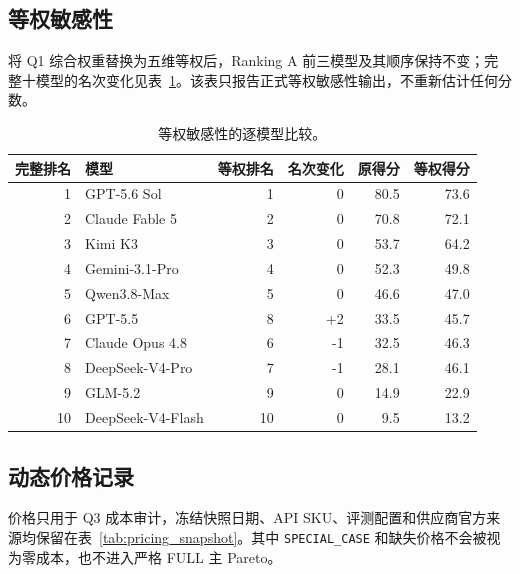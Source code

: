 \subsection{等权敏感性}
将 Q1 综合权重替换为五维等权后，Ranking A 前三模型及其顺序保持不变；完整十模型的名次变化见表~\ref{tab:equalweight}。该表只报告正式等权敏感性输出，不重新估计任何分数。

\begin{table}[htbp]
\centering
\caption{等权敏感性的逐模型比较。}
\label{tab:equalweight}
\small
\begin{tabularx}{\textwidth}{rXrrrr}
\toprule
完整排名 & 模型 & 等权排名 & 名次变化 & 原得分 & 等权得分\\
\midrule
1 & GPT-5.6 Sol & 1 & 0 & 80.5 & 73.6 \\
2 & Claude Fable 5 & 2 & 0 & 70.8 & 72.1 \\
3 & Kimi K3 & 3 & 0 & 53.7 & 64.2 \\
4 & Gemini-3.1-Pro & 4 & 0 & 52.3 & 49.8 \\
5 & Qwen3.8-Max & 5 & 0 & 46.6 & 47.0 \\
6 & GPT-5.5 & 8 & +2 & 33.5 & 45.7 \\
7 & Claude Opus 4.8 & 6 & -1 & 32.5 & 46.3 \\
8 & DeepSeek-V4-Pro & 7 & -1 & 28.1 & 46.1 \\
9 & GLM-5.2 & 9 & 0 & 14.9 & 22.9 \\
10 & DeepSeek-V4-Flash & 10 & 0 & 9.5 & 13.2 \\
\bottomrule
\end{tabularx}
\end{table}

\subsection{动态价格记录}
价格只用于 Q3 成本审计，冻结快照日期、API SKU、评测配置和供应商官方来源均保留在表~\ref{tab:pricing_snapshot}。其中 \texttt{SPECIAL\_CASE} 和缺失价格不会被视为零成本，也不进入严格 FULL 主 Pareto。

